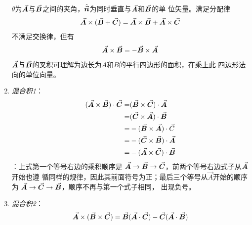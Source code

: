 \begin{enumerate}
          $\theta$为$\vec{\bm{A}}$与$\vec{\bm{B}}$之间的夹角，$\hat{\vec{\bm{n}}}$为同时垂直与$\vec{\bm{A}}$和$\vec{\bm{B}}$的单
          位矢量。满足分配律
          \begin{equation}
              \vec{\bm{A}} \times(\vec{\bm{B}} + \vec{\bm{C}}) = \vec{\bm{A}} \times \vec{\bm{B}} + \vec{\bm{A}} \times \vec{\bm{C}}
                                            \label{eq:vec-vec-cross-distri}
          \end{equation}
          不满足交换律，但有
          \begin{equation}
              \vec{\bm{A}} \times \vec{\bm{B}} = - \vec{\bm{B}} \times \vec{\bm{A}}
            \label{eq:vec-vec-cross-exchange}
          \end{equation}
          $\vec{\bm{A}}$与$\vec{\bm{B}}$的叉积可理解为边长为$A$和$B$的平行四边形的面积，在乘上此
          四边形法向的单位向量。
      \item \textit{混合积1}：
            \begin{equation}
                \begin{aligned}
                    (\vec{\bm{A}} \times \vec{\bm{B}}) \cdot \vec{\bm{C}} 
                                        =& (\vec{\bm{B}} \times \vec{\bm{C}}) \cdot \vec{\bm{A}} \\
                                        =& (\vec{\bm{C}} \times \vec{\bm{A}}) \cdot \vec{\bm{B}} \\
                                        =&-(\vec{\bm{B}} \times \vec{\bm{A}}) \cdot \vec{C} \\
                                        =&-(\vec{\bm{C}} \times \vec{\bm{B}}) \cdot \vec{\bm{A}} \\
                                        =&-(\vec{\bm{A}} \times \vec{\bm{C}}) \cdot \vec{\bm{B}} \\
                \end{aligned}
                \label{eq:vec-vec-vec-mix1}
            \end{equation}
            ：上式第一个等号右边的乘积顺序是
            $\vec{\bm{A}} \rightarrow \vec{\bm{B}} \rightarrow \vec{\bm{C}}$，前两个等号右边式子从$\vec{\bm{A}}$开始也遵
            循同样的规律，因此其前面符号为正；最后三个等号从$\vec{A}$开始的顺序为
            $\vec{\bm{A}} \rightarrow \vec{\bm{C}} \rightarrow \vec{\bm{B}}$，顺序不再与第一个式子相同，
            出现负号。
      \item \textit{混合积2}：
          \begin{equation}
          \vec{\bm{A}} \times (\vec{\bm{B}} \times \vec{\bm{C}}) = \vec{\bm{B}}(\vec{\bm{A}} \cdot \vec{\bm{C}}) - \vec{\bm{C}}(\vec{\bm{A}} \cdot \vec{\bm{B}})
                                                        \label{eq:vec-vec-vec-mix2}
          \end{equation}
\end{enumerate}

